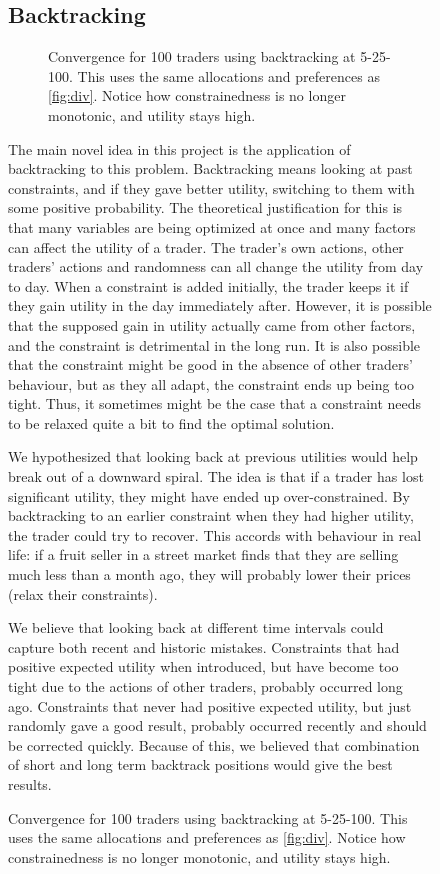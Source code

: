 \documentclass[12pt,a4paper,titlepage]{article}
\begin{document}
\begin{figure}[H]
\subsection{Backtracking}\label{backtrack}

\begin{figure}[H]
    \centering
    
    \caption{
      Convergence for 100 traders using backtracking at 5-25-100.
      This uses the same allocations and preferences as \ref{fig:div}.
      Notice how constrainedness is no longer monotonic, and utility stays high.
    }
    \label{fig:back}
\end{figure}

The main novel idea in this project is the application of backtracking to this problem.
Backtracking means looking at past constraints, and if they gave better utility, switching to them with some positive probability.
The theoretical justification for this is that many variables are being optimized at once and many factors can affect the utility of a trader.
The trader's own actions, other traders' actions and randomness can all change the utility from day to day.
When a constraint is added initially, the trader keeps it if they gain utility in the day immediately after.
However, it is possible that the supposed gain in utility actually came from other factors, and the constraint is detrimental in the long run.
It is also possible that the constraint might be good in the absence of other traders' behaviour, but as they all adapt, the constraint ends up being too tight.
Thus, it sometimes might be the case that a constraint needs to be relaxed quite a bit to find the optimal solution.

We hypothesized that looking back at previous utilities would help break out of a downward spiral.
The idea is that if a trader has lost significant utility, they might have ended up over-constrained.
By backtracking to an earlier constraint when they had higher utility, the trader could try to recover.
This accords with behaviour in real life: if a fruit seller in a street market finds that they are selling much less than a month ago, they will probably lower their prices (relax their constraints).

We believe that looking back at different time intervals could capture both recent and historic mistakes.
Constraints that had positive expected utility when introduced, but have become too tight due to the actions of other traders, probably occurred long ago.
Constraints that never had positive expected utility, but just randomly gave a good result, probably occurred recently and should be corrected quickly.
Because of this, we believed that combination of short and long term backtrack positions would give the best results.


\end{figure}
\end{document}
